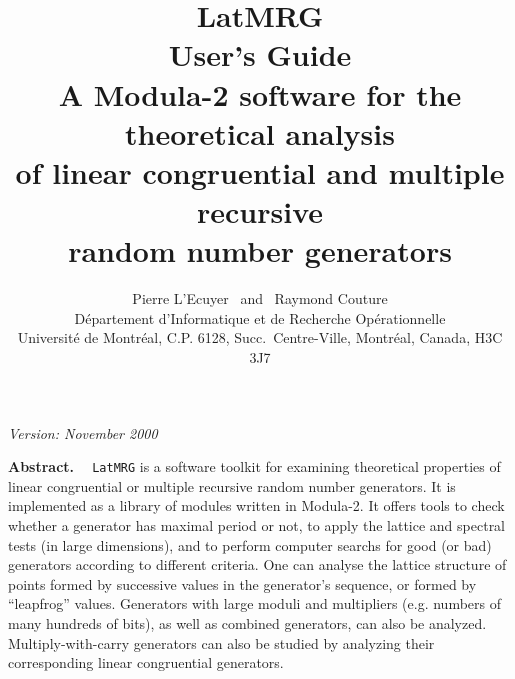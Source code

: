 \begin  {titlepage}
\null
\begin{flushright}
 {\it  Version: November 2000 } 
\end{flushright}
\vfill
%
\title  { \huge\bf  LatMRG \medskip \\ \LARGE\bf User's Guide\\ \bigskip
          \large\bf A Modula-2 software for the theoretical analysis \\
            of linear congruential and multiple recursive \\
            random number generators }

\author { Pierre L'Ecuyer \ and \ Raymond Couture \\ \medskip
          \small\rm  %
          D\'epartement d'Informatique et de Recherche Op\'erationnelle \\
          Universit\'e de Montr\'eal, C.P. 6128, Succ.\ Centre-Ville,
          Montr\'eal, Canada, H3C 3J7 }

{\noindent\large\bf Abstract. \ }
{\tt LatMRG} is a software toolkit for examining theoretical properties of
linear congruential or multiple recursive random number generators.
It is implemented as a library of modules written in Modula-2.
It offers tools to check whether a generator has maximal period or not,
to apply the lattice and spectral tests (in large dimensions),
and to perform computer searchs for good (or bad) generators 
according to different criteria.
One can analyse the lattice structure of points formed by successive
values in the generator's sequence, or formed by ``leapfrog'' values.
Generators with large moduli and multipliers (e.g. numbers of many
hundreds of bits), as well as combined generators, can also be analyzed.
Multiply-with-carry generators can also be studied by analyzing their
corresponding linear congruential generators. 


\end {titlepage}
